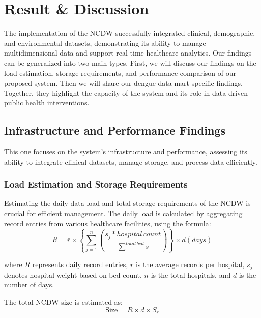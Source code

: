 \vspace{-4mm}
\section{Result \& Discussion}
The implementation of the NCDW  successfully integrated clinical, demographic, and environmental datasets, demonstrating its ability to manage multidimensional data and support real-time healthcare analytics. Our findings can be generalized into two main types. First, we will discuss our findings on the load estimation, storage requirements, and performance comparison of our proposed system. Then we will share our dengue data mart specific findings. Together, they highlight the capacity of the system and its role in data-driven public health interventions.



\subsection{Infrastructure and Performance Findings}
This one focuses on the system’s infrastructure and performance, assessing its ability to integrate clinical datasets, manage storage, and process data efficiently.



\subsubsection{Load Estimation and Storage Requirements}
\label{subsec:load_estimation}

Estimating the daily data load and total storage requirements of the NCDW is crucial for efficient management. The daily load is calculated by aggregating record entries from various healthcare facilities, using the formula:
\begin{equation}
     R =\bar{r}\times  \left \{ \sum_{j=1}^{n} \left ( \frac{s_j*hospital\,count}{\sum_{}^{total\,bed}s} \right ) \right \}\times d(days)
\end{equation}

where $R$ represents daily record entries, $\bar{r}$ is the average records per hospital, $s_j$ denotes hospital weight based on bed count, $n$ is the total hospitals, and $d$ is the number of days.

The total NCDW size is estimated as:
\begin{equation} 
\label{eqn2}
\text{Size} = R \times d \times S_r 
\end{equation}

